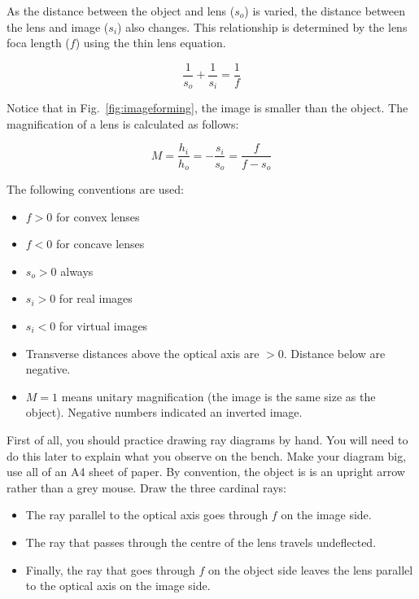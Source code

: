 \documentclass[a4paper]{report}
\begin{document}
As the distance between the object and lens ($s_o$) is varied, the distance between the lens and image ($s_i$) also changes. This relationship is determined by the lens foca length ($f$) using the thin lens equation.

\begin{equation}
\frac{1}{s_o} + \frac{1}{s_i} = \frac{1}{f}
\label{eq:thinlens}
\end{equation}

Notice that in Fig.~\ref{fig:imageforming}, the image is smaller than the object. The magnification of a lens is calculated as follows:

\begin{equation}
M = \frac{h_i}{h_o} = -\frac{s_i}{s_o} = \frac{f}{f-s_o}
\label{eq:mag}
\end{equation}

The following conventions are used:
\begin{itemize}
\item $f>0$ for convex lenses
\item $f<0$ for concave lenses
\item $s_o>0$ always
\item $s_i>0$ for real images
\item $s_i<0$ for virtual images
\item Transverse distances above the optical axis are $>0$. Distance
  below are negative. 
\item $M=1$ means unitary magnification (the image is the same size as
  the object). Negative numbers indicated an inverted image.
\end{itemize}

First of all, you should practice drawing ray diagrams by hand. 
You will need to do this later to explain what you observe on the bench.
Make your diagram big, use all of an A4 sheet of paper. 
By convention, the object is is an upright arrow rather than a grey mouse.
Draw the three cardinal rays:
\begin{itemize}
\item The ray parallel to the optical axis goes through $f$ on the image side.
\item The ray that passes through the centre of the lens travels undeflected.
\item Finally, the ray that goes through $f$ on the object side leaves the lens parallel to the optical axis on the image side. 
\end{itemize}
\end{document}
